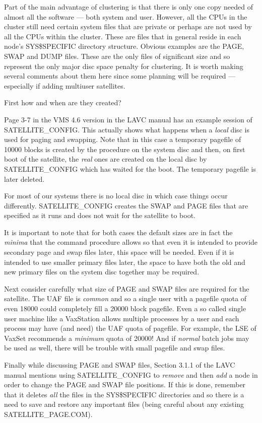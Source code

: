 Part of the main advantage of clustering is that there is only one copy needed
of almost all the software --- both system and user.
However, all the CPUs in the cluster still need certain system files that are
private or perhaps are not used by all the CPUs within the cluster.
These are files that in general reside in each node's SYS\$SPECIFIC directory
structure.
Obvious examples are the PAGE, SWAP and DUMP files.
These are the only files of significant size and so represent the only major
disc space penalty for clustering.
It is worth making several comments about them here since some planning
will be required --- especially if adding multiuser satellites.

First how and when are they created?

Page 3-7 in the VMS 4.6 version in the LAVC manual has an example session of
SATELLITE\_CONFIG.
This actually shows what happens when a {\em local} disc is used for paging
and swapping.
Note that in this case a temporary pagefile of 10000 blocks is created by the
procedure on the system disc and then, on first boot of the satellite, the
{\em real } ones are created on the local disc by SATELLITE\_CONFIG which has
waited for the boot.
The temporary pagefile is later deleted.

For most of our systems there is no local disc in which case things occur
differently.
SATELLITE\_CONFIG creates the SWAP and PAGE files that are specified as it
runs and does not wait for the satellite to boot.

It is important to note that for both cases the default sizes are in fact the
{\em minima} that the command procedure allows so that even it is intended to
provide secondary page and swap files later, this space will be needed.
Even if it is intended to use smaller primary files later, the space to have
both the old and new primary files on the system disc together may be required.

Next consider carefully what size of PAGE and SWAP files are required for 
the satellite.
The UAF file is {\em common} and so a single user with a pagefile quota of even
18000 could completely fill a 20000 block pagefile.
Even a so called single user machine like a VaxStation allows multiple processes
by a user and each process may have (and need) the UAF quota of pagefile.
For example, the LSE of VaxSet recommends a {\em minimum} quota of 20000!
And if {\em normal} batch jobs may be used as well, there will be trouble with
small pagefile and swap files.

Finally while discussing PAGE and SWAP files, Section 3.1.1 of the LAVC manual
mentions using SATELLITE\_CONFIG to {\em remove} and then {\em add} a node in
order to change the PAGE and SWAP file positions.
If this is done, remember that it deletes {\em all} the files in the
SYS\$SPECIFIC directories and so there is a need to save and restore any
important files (being careful about any existing SATELLITE\_PAGE.COM).

